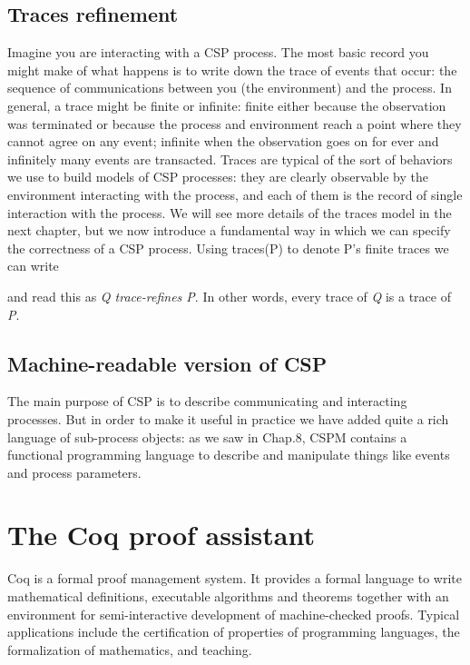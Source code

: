\subsection{Traces refinement}

Imagine you are interacting with a CSP process. The most basic record you might make of what happens is to write down the trace of events that occur: the sequence of communications between you (the environment) and the process. In general, a trace might be finite or infinite: finite either because the observation was terminated or because the process and environment reach a point where they cannot agree on any event; infinite when the observation goes on for ever and infinitely many events are transacted. Traces are typical of the sort of behaviors we use to build models of CSP processes: they are clearly observable by the environment interacting with the process, and each of them is the record of single interaction with the process. We will see more details of the traces model in the next chapter, but we now introduce a fundamental way in which we can specify the correctness of a CSP process. Using traces(P) to denote P’s finite traces we can write

and read this as \emph{Q trace-refines P}. In other words, every trace of \emph{Q} is a trace of \emph{P}.

\subsection{Machine-readable version of CSP}

The main purpose of CSP is to describe communicating and interacting processes. But in order to make it useful in practice we have added quite a rich language of sub-process objects: as we saw in Chap.8, CSPM contains a functional programming language to describe and manipulate things like events and process parameters.

\section{The Coq proof assistant}
\label{section:coq}

Coq is a formal proof management system. It provides a formal language to write mathematical definitions, executable algorithms and theorems together with an environment for semi-interactive development of machine-checked proofs. Typical applications include the certification of properties of programming languages, the formalization of mathematics, and teaching. 


